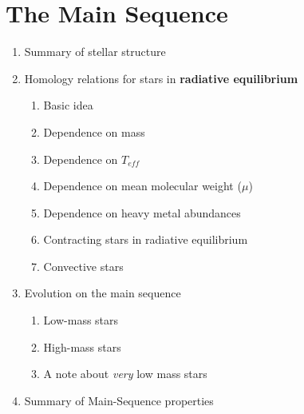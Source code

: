 \documentclass{article}
\begin{document}
\section{The Main Sequence}
\begin{enumerate}
    \item Summary of stellar structure
    \item Homology relations for stars in \textbf{radiative equilibrium}
        \begin{enumerate}
            \item Basic idea
            \item Dependence on mass
            \item Dependence on ${T_{eff}}$
            \item Dependence on mean molecular weight (${\mu}$)
            \item Dependence on heavy metal abundances
            \item Contracting stars in radiative equilibrium
            \item Convective stars
        \end{enumerate}
    \item Evolution on the main sequence
        \begin{enumerate}
            \item Low-mass stars
            \item High-mass stars
            \item A note about \emph{very} low mass stars
        \end{enumerate}
    \item Summary of Main-Sequence properties
\end{enumerate}

\newpage
\end{document}
